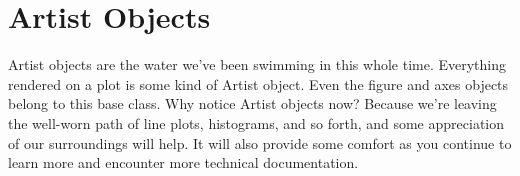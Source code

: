 \chapter{Artist Objects}

Artist objects are the water we've been swimming in this whole time. Everything rendered on a plot is some kind of Artist object. Even the figure and axes objects belong to this base class. Why notice Artist objects now? Because we're leaving the well-worn path of line plots, histograms, and so forth, and some appreciation of our surroundings will help. It will also provide some comfort as you continue to learn more and encounter more technical documentation. 